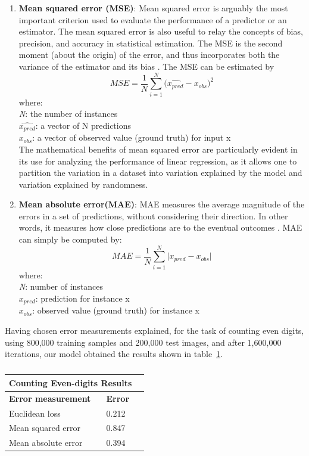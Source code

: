 \begin{enumerate}
\item \textbf{Mean squared error (MSE)}: Mean squared error is arguably the most important criterion used to evaluate the performance of a predictor or an estimator. The mean squared error is also useful to relay the concepts of bias, precision, and accuracy in statistical estimation. The MSE is the second moment (about the origin) of the error, and thus incorporates both the variance of the estimator and its bias \cite{lehmann1998theory}. The MSE can be estimated by
$$MSE = {\frac{1} {N}{\sum\limits_{i = 1}^N {(\hat{x_{pred}} - x_{obs} } })^{2} } $$
where:\\
\textit{N}: the number of instances\\
\textit{ $\hat{x_{pred}}$}: a vector of N predictions\\
\textit{$x_{obs}$}: a vector of observed value (ground truth) for input x\\

The mathematical benefits of mean squared error are particularly evident in its use for analyzing the performance of linear regression, as it allows one to partition the variation in a dataset into variation explained by the model and variation explained by randomness.
\item \textbf{Mean absolute error(MAE)}: MAE measures the average magnitude of the errors in a set of predictions, without considering their direction. In other words, it measures how close predictions are to the eventual outcomes \cite{willmott2005advantages}. MAE can simply be computed by:
$$MAE = {\frac{1} {N}{\sum\limits_{i = 1}^N {|x_{pred} - x_{obs} } }| } $$
where:\\
\textit{N}: number of instances\\
\textit{ $x_{pred}$}: prediction for instance x\\
\textit{$x_{obs}$}: observed value (ground truth) for instance x
\end{enumerate}

\noindent Having chosen error measurements explained, for the task of counting even digits, using 800,000 training samples and 200,000 test images, and after 1,600,000 iterations, our model obtained the results shown in table~\ref{tab:res}.


\begin{table}[H]
\centering
\small\sffamily
\begin{tabular}{llr}
\multicolumn{2}{c}{\textbf{\textbf{Counting Even-digits Results }}} \\
\bottomrule
\textbf{Error measurement}        & \textbf{Error} \\
\bottomrule
Euclidean loss           & 0.212  \\
Mean squared error       & 0.847  \\
Mean absolute error      & 0.394 \\
\bottomrule
\end{tabular}
\caption{}
\label{tab:res}
\end{table} 


